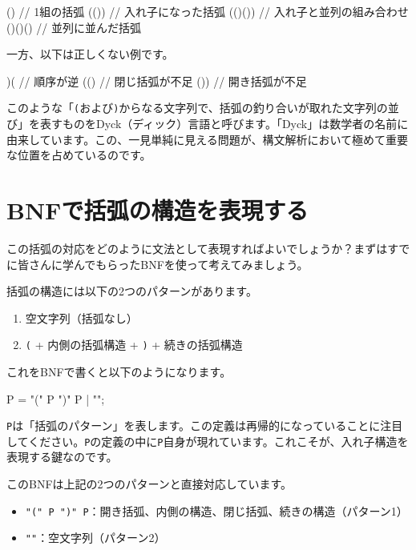 \begin{codescreen}{}
()          // 1組の括弧
(())        // 入れ子になった括弧
(()())      // 入れ子と並列の組み合わせ
()()()      // 並列に並んだ括弧
\end{codescreen}

一方、以下は正しくない例です。

\begin{codescreen}{}
)(          // 順序が逆
(()         // 閉じ括弧が不足
())         // 開き括弧が不足
\end{codescreen}

このような「\texttt{(}および\texttt{)}からなる文字列で、括弧の釣り合いが取れた文字列の並び」を表すものをDyck（ディック）言語と呼びます。「Dyck」は数学者の名前に由来しています。この、一見単純に見える問題が、構文解析において極めて重要な位置を占めているのです。

\section{BNFで括弧の構造を表現する}

この括弧の対応をどのように文法として表現すればよいでしょうか？まずはすでに皆さんに学んでもらったBNFを使って考えてみましょう。

括弧の構造には以下の2つのパターンがあります。

\begin{enumerate}
\item
  空文字列（括弧なし）
\item
  \texttt{(} + 内側の括弧構造 + \texttt{)} + 続きの括弧構造
\end{enumerate}

これをBNFで書くと以下のようになります。

\begin{codescreen}{}
P = "(" P ")" P | "";
\end{codescreen}

\texttt{P}は「括弧のパターン」を表します。この定義は再帰的になっていることに注目してください。\texttt{P}の定義の中に\texttt{P}自身が現れています。これこそが、入れ子構造を表現する鍵なのです。

このBNFは上記の2つのパターンと直接対応しています。

\begin{itemize}
\item
  \texttt{"("\ P\ ")"\ P}：開き括弧、内側の構造、閉じ括弧、続きの構造（パターン1）
\item
  \texttt{""}：空文字列（パターン2）
\end{itemize}

